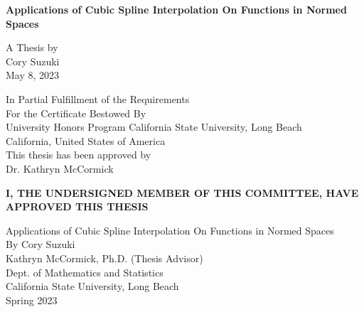 \documentclass[onecolumn, 12 pt, doublespace, fullpage, a4paper]{report}
\begin{document}

\thispagestyle{empty}
\addvspace{5mm}  %


\begin{center}
\begin{doublespace}
{\textbf{{\large Applications of Cubic Spline Interpolation On Functions in Normed Spaces}}}%
\end{doublespace}

\vspace{10mm}
{A Thesis by}\\
{Cory Suzuki}\\
{May 8, 2023}%

\vspace{30mm}

{ In Partial Fulfillment of the Requirements}\\[12pt]
{ For the Certificate Bestowed By}\\[12pt]
{University Honors Program} \vfill
{California State University, Long Beach }\\
{California, United States of America}\\
{This thesis has been approved by}\\
{Dr. Kathryn McCormick}
\vfill

\end{center}
\newpage


%
\begin{center}
\begin{doublespace}
{\textbf{{\large I, THE UNDERSIGNED MEMBER OF THIS COMMITTEE, HAVE APPROVED THIS THESIS}}}%
\end{doublespace}

\vspace{10mm}
{Applications of Cubic Spline Interpolation On Functions in Normed Spaces}\\
{By Cory Suzuki}\\

\vspace{30mm}
 \vfill
 \hrulefill \newline
{Kathryn McCormick, Ph.D. (Thesis Advisor)}\\
{Dept. of Mathematics and Statistics}\\
{California State University, Long Beach}\\
{Spring 2023}\\
\vfill

\end{center}
\newpage
\end{document}
